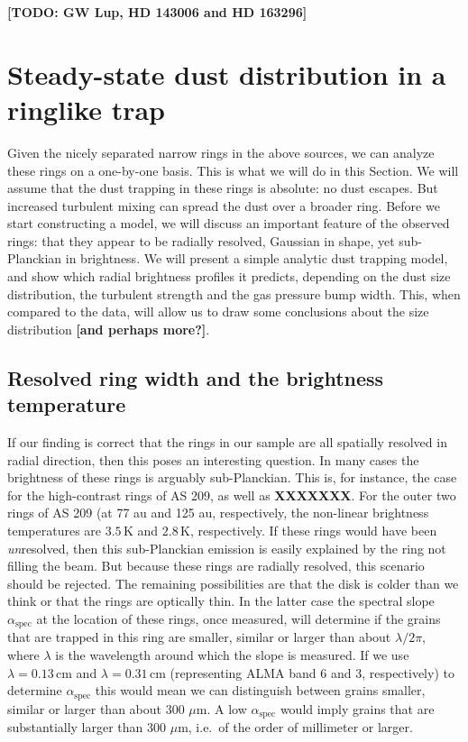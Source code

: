 \documentclass{aa}
\begin{document}
{\bf [TODO: GW Lup, HD 143006 and HD 163296]}

\section{Steady-state dust distribution in a ringlike trap}
\label{sec-steady-state-analytic-trap-model}
%
Given the nicely separated narrow rings in the above sources, we can analyze
these rings on a one-by-one basis. This is what we will do in this Section. We
will assume that the dust trapping in these rings is absolute: no dust escapes.
But increased turbulent mixing can spread the dust over a broader ring. Before
we start constructing a model, we will discuss an important feature of the
observed rings: that they appear to be radially resolved, Gaussian in shape, yet
sub-Planckian in brightness. We will present a simple analytic dust trapping
model, and show which radial brightness profiles it predicts, depending on the
dust size distribution, the turbulent strength and the gas pressure bump width.
This, when compared to the data, will allow us to draw some conclusions about
the size distribution {\bf [and perhaps more?]}.

\subsection{Resolved ring width and the brightness temperature}
If our finding is correct that the rings in our sample are all spatially
resolved in radial direction, then this poses an interesting question. In many
cases the brightness of these rings is arguably sub-Planckian. This is, for
instance, the case for the high-contrast rings of AS 209, as well as {\bf
  XXXXXXX}. For the outer two rings of AS 209 (at 77 au and 125 au,
respectively, the non-linear brightness temperatures are $3.5\,\mathrm{K}$ and
$2.8\,\mathrm{K}$, respectively. If these rings would have been {\em
  un}resolved, then this sub-Planckian emission is easily explained by the ring
not filling the beam. But because these rings are radially resolved, this
scenario should be rejected. The remaining possibilities are that the disk is
colder than we think or that the rings are optically thin. In the latter case
the spectral slope $\alpha_{\mathrm{spec}}$ at the location of these rings, once
measured, will determine if the grains that are trapped in this ring are
smaller, similar or larger than about $\lambda/2\pi$, where $\lambda$ is the
wavelength around which the slope is measured. If we use
$\lambda=0.13\,\mathrm{cm}$ and $\lambda=0.31\,\mathrm{cm}$ (representing ALMA
band 6 and 3, respectively) to determine $\alpha_{\mathrm{spec}}$ this would
mean we can distinguish between grains smaller, similar or larger than about 300
$\mu$m. A low $\alpha_{\mathrm{spec}}$ would imply grains that are substantially
larger than 300 $\mu$m, i.e.~of the order of millimeter or larger.
\end{document}
